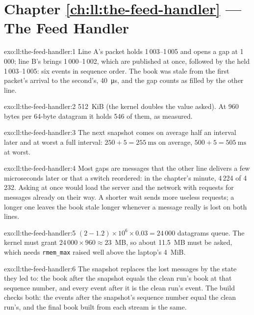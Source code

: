 \section*{Chapter \ref{ch:ll:the-feed-handler} --- The Feed Handler}

\begin{solution}{exo:ll:the-feed-handler:1}
Line A's packet holds 1\,003--1\,005 and opens a gap at 1\,000; line B's brings 1\,000--1\,002, which are published at once,
followed by the held 1\,003--1\,005: six events in sequence order. The book was stale from the first packet's arrival to the
second's, \qty{40}{\micro\second}, and the gap counts as filled by the other line.
\end{solution}

\begin{solution}{exo:ll:the-feed-handler:2}
512~KiB (the kernel doubles the value asked). At 960 bytes per 64-byte datagram it holds 546 of them, as measured.
\end{solution}

\begin{solution}{exo:ll:the-feed-handler:3}
The next snapshot comes on average half an interval later and at worst a full interval: $250 + 5 = \qty{255}{\milli\second}$ on
average, $500 + 5 = \qty{505}{\milli\second}$ at worst.
\end{solution}

\begin{solution}{exo:ll:the-feed-handler:4}
Most gaps are messages that the other line delivers a few microseconds later or that a switch reordered: in the chapter's
minute, 4\,224 of 4\,232. Asking at once would load the server and the network with requests for messages already on their
way. A shorter wait sends more useless requests; a longer one leaves the book stale longer whenever a message really is lost
on both lines.
\end{solution}

\begin{solution}{exo:ll:the-feed-handler:5}
$(2 - 1.2) \times 10^6 \times 0.03 = 24\,000$ datagrams queue. The kernel must grant $24\,000 \times 960 \approx 23$~MB, so
about 11.5~MB must be asked, which needs \texttt{rmem\_max} raised well above the laptop's 4~MiB.
\end{solution}

\begin{solution}{exo:ll:the-feed-handler:6}
The snapshot replaces the lost messages by the state they led to: the book after the snapshot equals the clean run's book at
that sequence number, and every event after it is the clean run's event. The build checks both: the events after the
snapshot's sequence number equal the clean run's, and the final book built from each stream is the same.
\end{solution}

